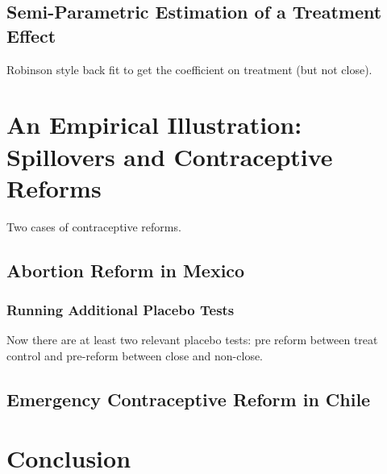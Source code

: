 \documentclass{article}
\begin{document}
\begin{spacing}{1.1}
\subsection{Semi-Parametric Estimation of a Treatment Effect}
Robinson style back fit to get the coefficient on treatment (but not close).
\citet{Imbens2004}

\section{An Empirical Illustration: Spillovers and Contraceptive Reforms}
Two cases of contraceptive reforms.
\subsection{Abortion Reform in Mexico}
\subsubsection{Running Additional Placebo Tests}
Now there are at least two relevant placebo tests: pre reform between treat control
and pre-reform between close and non-close.

\subsection{Emergency Contraceptive Reform in Chile}


\section{Conclusion}



\end{spacing}
\end{document}
